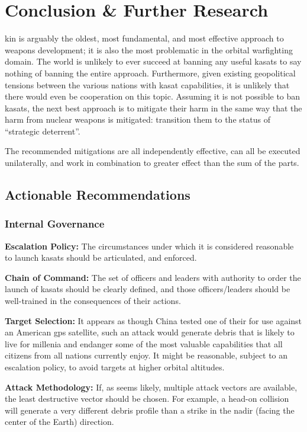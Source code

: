 \section{Conclusion \& Further Research}

\ac{kin} is arguably the oldest, most fundamental, and most effective
approach to weapons development; it is also the most problematic in
the orbital warfighting domain.  The world is unlikely to ever succeed
at banning any useful \acp{kasat} to say nothing of banning the entire
approach.  Furthermore, given existing geopolitical tensions between
the various nations with \ac{kasat} capabilities, it is unlikely that
there would even be cooperation on this topic.  Assuming it is not
possible to ban \acp{kasat}, the next best approach is to mitigate
their harm in the same way that the harm from nuclear weapons is
mitigated: transition them to the status of ``strategic deterrent''.

The recommended mitigations are all independently effective, can all
be executed unilaterally, and work in combination to greater effect
than the sum of the parts.


\subsection{Actionable Recommendations}

\subsubsection{Internal Governance}

\textbf{Escalation Policy:} The circumstances under which it is
considered reasonable to launch \acp{kasat} should be articulated, and
enforced.

\textbf{Chain of Command:} The set of officers and leaders with
authority to order the launch of \acp{kasat} should be clearly
defined, and those officers/leaders should be well-trained in the
consequences of their actions.

\textbf{Target Selection:} It appears as though China tested one of
their  for use against an American \ac{gps} satellite,
such an attack would generate debris that is likely to live for
millenia and endanger some of the most valuable capabilities that all
citizens from all nations currently enjoy.  It might be reasonable,
subject to an escalation policy, to avoid targets at higher orbital
altitudes.

\textbf{Attack Methodology:} If, as seems likely, multiple attack
vectors are available, the least destructive vector should be chosen.
For example, a head-on collision will generate a very different debris
profile than a strike in the nadir (facing the center of the Earth)
direction.

